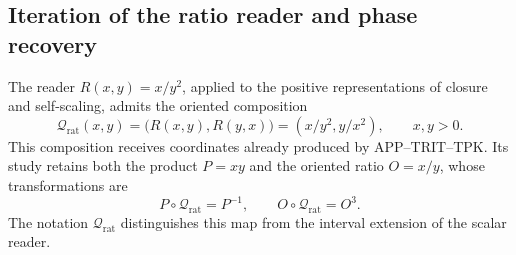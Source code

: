 \subsection{Iteration of the ratio reader and phase recovery}
\label{corpus9:iv:q}

The reader \(R(x,y)=x/y^2\), applied to the positive representations
of closure and self-scaling, admits the oriented composition
\[
 \mathcal Q_{\mathrm{rat}}(x,y)
   =\bigl(R(x,y),R(y,x)\bigr)
   =(x/y^2,y/x^2),\qquad x,y>0.
\]
This composition receives coordinates already produced by
APP--TRIT--TPK. Its study retains both the product \(P=xy\)
and the oriented ratio \(O=x/y\), whose transformations are
\[
 P\circ\mathcal Q_{\mathrm{rat}}=P^{-1},\qquad
 O\circ\mathcal Q_{\mathrm{rat}}=O^3.
\]
The notation \(\mathcal Q_{\mathrm{rat}}\) distinguishes this map
from the interval extension of the scalar reader.

